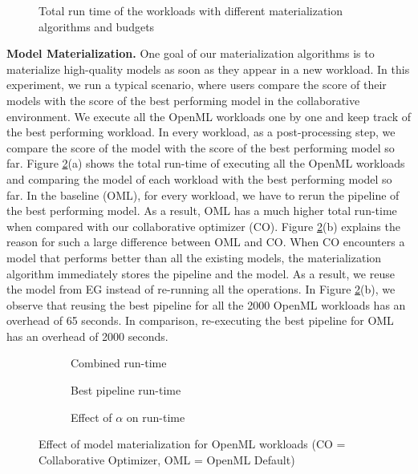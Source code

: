 \begin{figure}
\centering
 \resizebox{0.7\columnwidth}{!}{%
%
}
\caption{Total run time of the workloads with different materialization algorithms and budgets}
\label{run-time-vs-mat}
\end{figure}

\textbf{Model Materialization. }
One goal of our materialization algorithms is to materialize high-quality models as soon as they appear in a new workload.
In this experiment, we run a typical scenario, where users compare the score of their models with the score of the best performing model in the collaborative environment.
We execute all the OpenML workloads one by one and keep track of the best performing workload.
In every workload, as a post-processing step, we compare the score of the model with the score of the best performing model so far.
Figure \ref{exp-model-materialization}(a) shows the total run-time of executing all the OpenML workloads and comparing the model of each workload with the best performing model so far.
In the baseline (OML), for every workload, we have to rerun the pipeline of the best performing model.
As a result, OML has a much higher total run-time when compared with our collaborative optimizer (CO).
Figure \ref{exp-model-materialization}(b) explains the reason for such a large difference between OML and CO.
When CO encounters a model that performs better than all the existing models, the materialization algorithm immediately stores the pipeline and the model.
As a result, we reuse the model from EG instead of re-running all the operations.
In Figure \ref{exp-model-materialization}(b), we observe that reusing the best pipeline for all the 2000 OpenML workloads has an overhead of 65 seconds.
In comparison, re-executing the best pipeline for OML has an overhead of 2000 seconds.

\begin{figure}
\begin{subfigure}[b]{0.5\linewidth}
\centering
 \resizebox{\columnwidth}{!}{%
%
}
\caption{Combined run-time}
\end{subfigure}%
\begin{subfigure}[b]{0.5\linewidth}
\centering
 \resizebox{\columnwidth}{!}{%
%
}
\caption{Best pipeline run-time}
\end{subfigure}
\begin{subfigure}[b]{\linewidth}
\centering
 \resizebox{\columnwidth}{!}{%
%
}
\caption{Effect of $\alpha$ on run-time}
\end{subfigure}
\caption{Effect of model materialization for OpenML workloads (CO = Collaborative Optimizer, OML = OpenML Default)}
\label{exp-model-materialization}
\end{figure}

